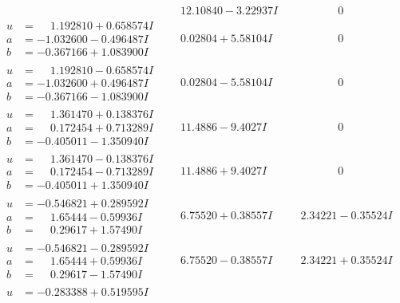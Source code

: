 \documentclass[1p]{elsarticle_modified}
\theoremstyle{definition}
\begin{document}
$$\begin{array}{c|c|c}
 & \phantom{-}12.10840 - 3.22937 I & \phantom{-0.000000 } 0 \\ \hline\begin{aligned}
u &= \phantom{-}1.192810 + 0.658574 I \\
a &= -1.032600 - 0.496487 I \\
b &= -0.367166 + 1.083900 I\end{aligned}
 & \phantom{-}0.02804 + 5.58104 I & \phantom{-0.000000 } 0 \\ \hline\begin{aligned}
u &= \phantom{-}1.192810 - 0.658574 I \\
a &= -1.032600 + 0.496487 I \\
b &= -0.367166 - 1.083900 I\end{aligned}
 & \phantom{-}0.02804 - 5.58104 I & \phantom{-0.000000 } 0 \\ \hline\begin{aligned}
u &= \phantom{-}1.361470 + 0.138376 I \\
a &= \phantom{-}0.172454 + 0.713289 I \\
b &= -0.405011 - 1.350940 I\end{aligned}
 & \phantom{-}11.4886 - 9.4027 I & \phantom{-0.000000 } 0 \\ \hline\begin{aligned}
u &= \phantom{-}1.361470 - 0.138376 I \\
a &= \phantom{-}0.172454 - 0.713289 I \\
b &= -0.405011 + 1.350940 I\end{aligned}
 & \phantom{-}11.4886 + 9.4027 I & \phantom{-0.000000 } 0 \\ \hline\begin{aligned}
u &= -0.546821 + 0.289592 I \\
a &= \phantom{-}1.65444 - 0.59936 I \\
b &= \phantom{-}0.29617 + 1.57490 I\end{aligned}
 & \phantom{-}6.75520 + 0.38557 I & \phantom{-}2.34221 - 0.35524 I \\ \hline\begin{aligned}
u &= -0.546821 - 0.289592 I \\
a &= \phantom{-}1.65444 + 0.59936 I \\
b &= \phantom{-}0.29617 - 1.57490 I\end{aligned}
 & \phantom{-}6.75520 - 0.38557 I & \phantom{-}2.34221 + 0.35524 I \\ \hline\begin{aligned}
u &= -0.283388 + 0.519595 I \\

\end{aligned}
\end{array}$$
\end{document}
